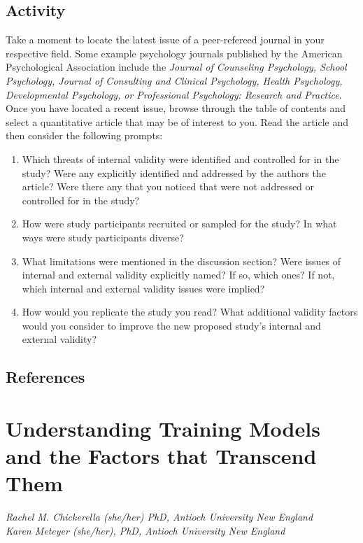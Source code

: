 \documentclass[
  11pt,
]{book}
\providecommand{\tightlist}{%
  \setlength{\itemsep}{0pt}\setlength{\parskip}{0pt}}
\begin{document}
\section{Activity}\label{activity}

Take a moment to locate the latest issue of a peer-refereed journal in your respective field. Some example psychology journals published by the American Psychological Association include the \emph{Journal of Counseling Psychology, School Psychology, Journal of Consulting and Clinical Psychology, Health Psychology, Developmental Psychology, or Professional Psychology: Research and Practice}. Once you have located a recent issue, browse through the table of contents and select a quantitative article that may be of interest to you. Read the article and then consider the following prompts:

\begin{enumerate}
\def\labelenumi{\arabic{enumi}.}
\tightlist
\item
  Which threats of internal validity were identified and controlled for in the study? Were any explicitly identified and addressed by the authors the article? Were there any that you noticed that were not addressed or controlled for in the study?
\item
  How were study participants recruited or sampled for the study? In what ways were study participants diverse?
\item
  What limitations were mentioned in the discussion section? Were issues of internal and external validity explicitly named? If so, which ones? If not, which internal and external validity issues were implied?
\item
  How would you replicate the study you read? What additional validity factors would you consider to improve the new proposed study's internal and external validity?
\end{enumerate}

\section{References}\label{references}

\chapter{Understanding Training Models and the Factors that Transcend Them}\label{TrainMod}

\emph{Rachel M. Chickerella (she/her) PhD, Antioch University New England}\\
\emph{Karen Meteyer (she/her), PhD, Antioch University New England}\\
\end{document}
